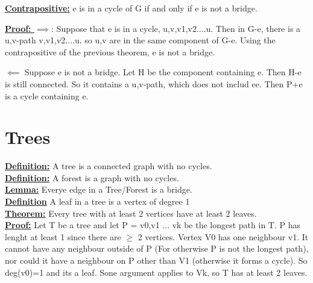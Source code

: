 \documentclass[12pt]{article}
\newcommand{\myt}[1]{\textbf{\underline{#1}}}
\begin{document}
	\myt{Contrapositive:} e is in a cycle of G if and only if e is not a bridge.
	
	\myt{Proof: $\implies$}: Suppose that e is in a cycle, u,v,v1,v2....u. Then in G-e, there is a u,v-path v,v1,v2....u. so u,v are in the same component of G-e. Using the contrapositive of the previous theorem, e is not a bridge.
	
	\myt{$\impliedby$} Suppose e is not a bridge. Let H be the component containing e. Then H-e is still connected. So it contains a u,v-path, which does not includ ee. Then P+e is a cycle containing e.
	
	\section*{Trees}
	
	\myt{Definition:} A tree is a connected graph with no cycles.\\
	\myt{Definition:} A forest is a graph with no cycles.\\
	
	\myt{Lemma:} Everye edge in a Tree/Forest is a bridge.\\
	
	\myt{Definition} A leaf in a tree is a vertex of degree 1\\
	
	\myt{Theorem:} Every tree with at least 2 vertices have at least 2 leaves.\\
	\myt{Proof:} Let T be a tree and let P = v0,v1 ... vk be the longest path in T. P has lenght at least 1 since there are $\geq$ 2 vertices. Vertex V0 has one neighbour v1. It cannot have any neighbour outside of P (For otherwise P is not the longest path), nor could it have a neighbour on P other than V1 (otherwise it forms a cycle). So deg(v0)=1 and its a leaf. Sone argument applies to Vk, so T has at least 2 leaves.\\
	
	
	
\end{document}
